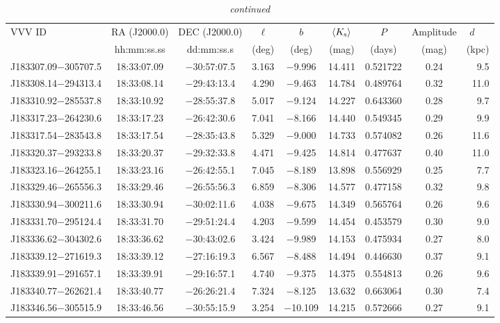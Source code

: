 \begin{table*}
\centering
\caption[]{{\it continued}}
\begin{tabular}{lcccccccr}
\hline \hline
VVV ID & RA (J2000.0)  & DEC (J2000.0) & $\ell$ & $b$ &  $\langle K_{\rm s} \rangle$ & $P$ & Amplitude & $d$~~~ \\
     & hh:mm:ss.ss    & dd:mm:ss.s   &  (deg) & (deg) &   (mag)       & (days) & (mag) & (kpc)   \\
\hline
J183307.09$-$305707.5 & 18:33:07.09 & $-$30:57:07.5 &  3.163 & $-$9.996 & 14.411 & 0.521722 & 0.24 & 9.5 \\
J183308.14$-$294313.4 & 18:33:08.14 & $-$29:43:13.4 &  4.290 & $-$9.463 & 14.784 & 0.489764 & 0.32 & 11.0 \\
J183310.92$-$285537.8 & 18:33:10.92 & $-$28:55:37.8 &  5.017 & $-$9.124 & 14.227 & 0.643360 & 0.28 & 9.7 \\
J183317.23$-$264230.6 & 18:33:17.23 & $-$26:42:30.6 &  7.041 & $-$8.166 & 14.440 & 0.549345 & 0.29 & 9.9 \\
J183317.54$-$283543.8 & 18:33:17.54 & $-$28:35:43.8 &  5.329 & $-$9.000 & 14.733 & 0.574082 & 0.26 & 11.6 \\
J183320.37$-$293233.8 & 18:33:20.37 & $-$29:32:33.8 &  4.471 & $-$9.425 & 14.814 & 0.477637 & 0.40 & 11.0 \\
J183323.16$-$264255.1 & 18:33:23.16 & $-$26:42:55.1 &  7.045 & $-$8.189 & 13.898 & 0.556929 & 0.25 & 7.7 \\
J183329.46$-$265556.3 & 18:33:29.46 & $-$26:55:56.3 &  6.859 & $-$8.306 & 14.577 & 0.477158 & 0.32 & 9.8 \\
J183330.94$-$300211.6 & 18:33:30.94 & $-$30:02:11.6 &  4.038 & $-$9.675 & 14.349 & 0.565764 & 0.26 & 9.6 \\
J183331.70$-$295124.4 & 18:33:31.70 & $-$29:51:24.4 &  4.203 & $-$9.599 & 14.454 & 0.453579 & 0.30 & 9.0 \\
J183336.62$-$304302.6 & 18:33:36.62 & $-$30:43:02.6 &  3.424 & $-$9.989 & 14.153 & 0.475934 & 0.27 & 8.0 \\
J183339.12$-$271619.3 & 18:33:39.12 & $-$27:16:19.3 &  6.567 & $-$8.488 & 14.494 & 0.446630 & 0.37 & 9.1 \\
J183339.91$-$291657.1 & 18:33:39.91 & $-$29:16:57.1 &  4.740 & $-$9.375 & 14.375 & 0.554813 & 0.26 & 9.6 \\
J183340.77$-$262621.4 & 18:33:40.77 & $-$26:26:21.4 &  7.324 & $-$8.125 & 13.632 & 0.663064 & 0.30 & 7.4 \\
J183346.56$-$305515.9 & 18:33:46.56 & $-$30:55:15.9 &  3.254 & $-$10.109 & 14.215 & 0.572666 & 0.27 & 9.1 \\

\end{tabular}
\end{table*}
